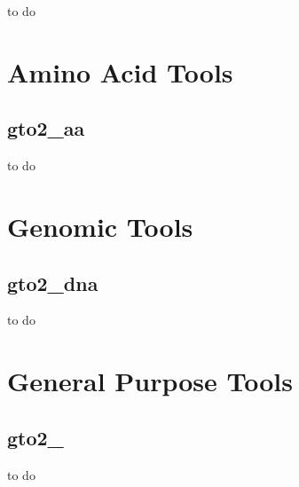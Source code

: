 \documentclass[11pt,]{krantz}
\begin{document}
to do

\chapter{Amino Acid Tools}\label{amino-acid-tools}

\section{gto2\_aa}\label{gto2_aa}

to do

\chapter{Genomic Tools}\label{genomic-tools}

\section{gto2\_dna}\label{gto2_dna}

to do

\chapter{General Purpose Tools}\label{general-purpose-tools}

\section{gto2\_}\label{gto2_}

to do



\printindex
\end{document}

